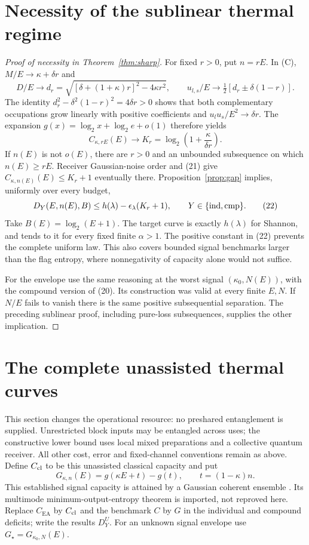 \documentclass[11pt]{article}
\newcommand{\CEA}{C_{\mathrm{EA}}}
\newcommand{\cmp}{\mathrm{cmp}}
\begin{document}
\section{Necessity of the sublinear thermal regime}
\begin{proof}[Proof of necessity in Theorem~\ref{thm:sharp}]
For fixed \(r>0\), put \(n=rE\). In (C), \(M/E\to\kappa+\delta r\) and
\[
 D/E\to d_r=\sqrt{[\delta+(1+\kappa)r]^2-4\kappa r^2},
 \qquad
 u_{l,s}/E\to\tfrac12[d_r\mathbin{\pm}\delta(1-r)].
\]
The identity \(d_r^2-\delta^2(1-r)^2=4\delta r>0\)
shows that both complementary occupations grow linearly with
positive coefficients and \(u_lu_s/E^2\to\delta r\).
The expansion \(g(x)=\log_2x+\log_2e+o(1)\) therefore yields
\[
 C_{\kappa,rE}(E)\longrightarrow
 K_r=\log_2\left(1+\frac{\kappa}{\delta r}\right).     \tag{21}
\]
If \(n(E)\) is not \(o(E)\), there are \(r>0\) and an unbounded
subsequence on which \(n(E)\ge rE\).
Receiver Gaussian-noise order and (21) give
\(C_{\kappa,n(E)}(E)\le K_r+1\) eventually there.
Proposition~\ref{prop:gap} implies, uniformly over every budget,
\[
 D_Y(E,n(E),B)
 \le h(\lambda)-\epsilon_\lambda(K_r+1),
 \qquad Y\in\{{\rm ind},\cmp\}.                     \tag{22}
\]
Take \(B(E)=\log_2(E+1)\). The target curve is exactly \(h(\lambda)\)
for Shannon, and tends to it for every fixed finite \(\alpha>1\).
The positive constant in (22) prevents the complete uniform law.
This also covers bounded signal benchmarks larger than the flag
entropy, where nonnegativity of capacity alone would not suffice.

For the envelope use the same reasoning at the worst signal
\((\kappa_0,N(E))\), with the compound version of (20).
Its construction was valid at every finite \(E,N\).
If \(N/E\) fails to vanish there is the same positive subsequential
separation. The preceding sublinear proof, including pure-loss
subsequences, supplies the other implication.
\end{proof}

\section{The complete unassisted thermal curves}
\label{sec:unassisted}
This section changes the operational resource: no preshared entanglement
is supplied. Unrestricted block inputs may be entangled across uses;
the constructive lower bound uses local mixed preparations and a
collective quantum receiver. All other cost, error and fixed-channel
conventions remain as above. Define \(C_{\rm cl}\) to be this unassisted
classical capacity and put
\[
 G_{\kappa,n}(E)=g(\kappa E+t)-g(t),\qquad t=(1-\kappa)n.
\]
This established signal capacity is attained by a Gaussian coherent
ensemble \cite{gaussiancl}. Its multimode minimum-output-entropy theorem
is imported, not reproved here. Replace \(\CEA\) by \(C_{\rm cl}\) and
the benchmark \(C\) by \(G\) in the individual and compound deficits;
write the results \(D^U_Y\). For an unknown signal envelope use
\(G_\star=G_{\kappa_0,N}(E)\).
\end{document}
